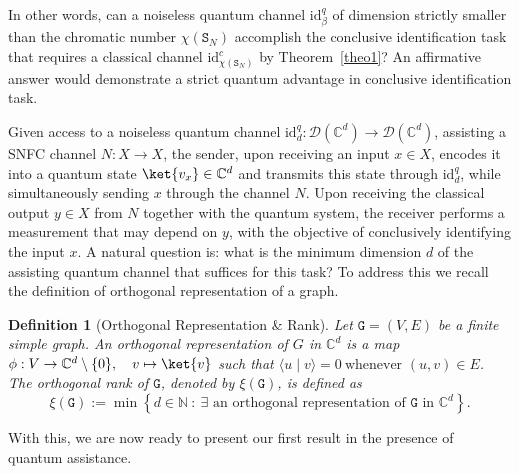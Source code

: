 \documentclass[12pt,a4paper]{article}
\newtheorem{definition}{Definition}
\begin{document}
\noindent \noindent In other words, can a noiseless quantum channel $\mathrm{id}^q_\beta$ of dimension strictly smaller than the chromatic number $\chi(\mathtt{S}_N)$ accomplish the conclusive identification task that requires a classical channel $\mathrm{id}^c_{\chi(\mathtt{S}_N)}$ by Theorem~\ref{theo1}? An affirmative answer  would demonstrate a strict quantum advantage in conclusive identification task.


\noindent Given access to a noiseless quantum channel $\mathrm{id}^q_d : \mathcal{D}(\mathbb{C}^d) \to \mathcal{D}(\mathbb{C}^d)$, assisting a SNFC channel $N : X \to X$, the sender, upon receiving an input $x \in X$, encodes it into a quantum state $\ket{v_x} \in \mathbb{C}^d$ and transmits this state through $\mathrm{id}^q_d$, while simultaneously sending $x$ through the channel $N$. Upon receiving the classical output $y \in X$ from $N$ together with the quantum system, the receiver performs a measurement that may depend on $y$, with the objective of conclusively identifying the input $x$. A natural question is: what is the minimum dimension $d$ of the assisting quantum channel that suffices for this task? To address this we recall the definition of orthogonal representation of a graph. 

\begin{definition}[Orthogonal Representation \& Rank]
Let $\mathtt{G} = (V,E)$ be a finite simple graph. An orthogonal representation of $G$ in  $\mathbb{C}^d$ is a map $\phi : V \to \mathbb{C}^d \setminus \{0\}, \quad v \mapsto \ket{v}$ such that $\langle u \mid v \rangle = 0~ \text{whenever } (u,v) \in E$. The orthogonal rank of $\mathtt{G}$, denoted by $\xi(\mathtt{G})$, is defined as $$\xi(\mathtt{G}) := \min \left\{ d \in \mathbb{N}~:~ \exists \text{ an orthogonal representation of } \mathtt{G} \text{ in } \mathbb{C}^d \right\}.$$
\end{definition}

\noindent With this, we are now ready to present our first result in the presence of quantum assistance.
\end{document}
